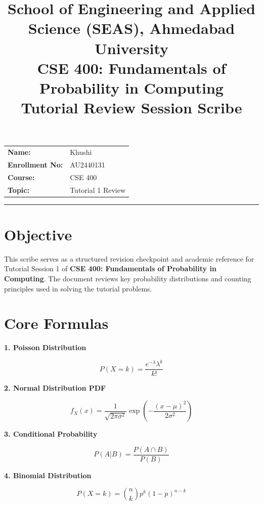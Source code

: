 \documentclass[11pt]{article}
\title{
\normalsize School of Engineering and Applied Science (SEAS), Ahmedabad University \\
\vspace{0.2cm}
\textbf{CSE 400: Fundamentals of Probability in Computing}\\
\Large Tutorial Review Session Scribe
}
\author{}
\date{}
\begin{document}
\maketitle

\vspace{-1cm}

\begin{center}
\begin{tabular}{ll}
\textbf{Name:} & Khushi \\[1.5ex]
\textbf{Enrollment No:} & AU2440131 \\[1.5ex]
\textbf{Course:} & CSE 400 \\[1.5ex]
\textbf{Topic:} & Tutorial 1 Review
\end{tabular}
\end{center}

\hrule
\vspace{0.5cm}

\section*{Objective}

This scribe serves as a structured revision checkpoint and academic reference for 
Tutorial Session 1 of \textbf{CSE 400: Fundamentals of Probability in Computing}. 
The document reviews key probability distributions and counting principles used in solving the tutorial problems.

\bigskip

\section*{Core Formulas}

\textbf{1. Poisson Distribution}

\[
P(X=k) = \frac{e^{-\lambda}\lambda^k}{k!}
\]

\textbf{2. Normal Distribution PDF}

\[
f_X(x)=\frac{1}{\sqrt{2\pi\sigma^2}}
\exp\left(-\frac{(x-\mu)^2}{2\sigma^2}\right)
\]

\textbf{3. Conditional Probability}

\[
P(A|B) = \frac{P(A \cap B)}{P(B)}
\]

\textbf{4. Binomial Distribution}

\[
P(X=k) = \binom{n}{k}p^k(1-p)^{n-k}
\]

\bigskip
\end{document}
